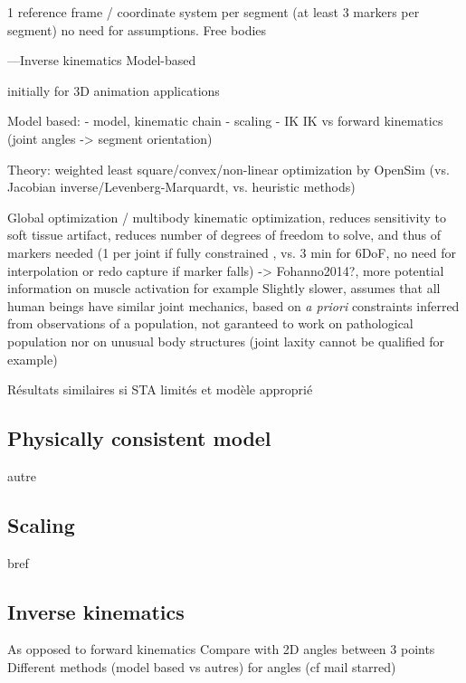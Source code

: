 1 reference frame / coordinate system per segment (at least 3 markers per segment) \cite{Wu2002, Wu2005}
no need for assumptions. Free bodies



---Inverse kinematics 
Model-based

initially for 3D animation applications

Model based:
- model, kinematic chain
- scaling
- IK
IK vs forward kinematics (joint angles -> segment orientation)


Theory: weighted least square/convex/non-linear optimization by OpenSim (vs. Jacobian inverse/Levenberg-Marquardt, vs. heuristic methods)


Global optimization / multibody kinematic optimization, reduces sensitivity to soft tissue artifact, reduces number of degrees of freedom to solve, and thus of markers needed (1 per joint if fully constrained \cite{Slater2018}, vs. 3 min for 6DoF, no need for interpolation or redo capture if marker falls) -> Fohanno2014?, more potential information on muscle activation for example \cite{Robinson2013,Kainz2016}
Slightly slower, assumes that all human beings have similar joint mechanics, based on \textit{a priori} constraints inferred from observations of a population, not garanteed to work on pathological population nor on unusual body structures (joint laxity cannot be qualified for example)

Résultats similaires si STA limités et modèle approprié \cite{Kainz2016}




\subsection{Physically consistent model}

autre


\subsection{Scaling}

bref


\subsection{Inverse kinematics}



As opposed to forward kinematics \newline
Compare with 2D angles between 3 points \newline
Different methods (model based vs autres) for angles (cf mail starred)\newline


